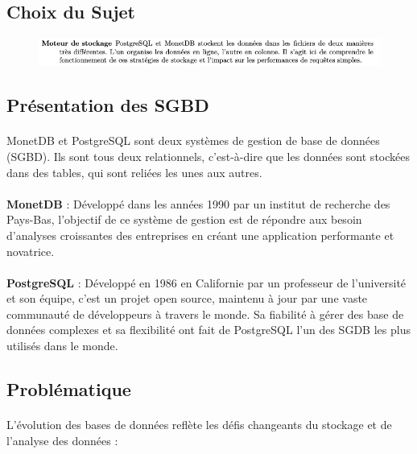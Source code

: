 \documentclass[11pt]{extarticle}
\begin{document}
\subsection{Choix du Sujet}

\begin{figure}[H]
    \centering
    \includegraphics[width=1\textwidth]{images/Sujet.png}
    \label{fig:sujet}
\end{figure}

\subsection{Présentation des SGBD}

\paragraph{} 
MonetDB et PostgreSQL sont deux systèmes de gestion de base de données (SGBD). Ils sont tous deux relationnels, c'est-à-dire que les données sont stockées dans des tables, qui sont reliées les unes aux autres.

\paragraph{} 
\textbf{MonetDB} : Développé dans les années 1990 par un institut de recherche des Pays-Bas, l'objectif de ce système de gestion est de répondre aux besoin d'analyses croissantes des entreprises en créant une application performante et novatrice.

\paragraph{} 
\textbf{PostgreSQL} : Développé en 1986 en Californie par un professeur de l'université et son équipe, c'est un projet open source, maintenu à jour par une vaste communauté de développeurs à travers le monde. Sa fiabilité à gérer des base de données complexes et sa flexibilité ont fait de PostgreSQL l'un des SGDB les plus utilisés dans le monde.

\subsection{Problématique}
\paragraph{}
L'évolution des bases de données reflète les défis changeants du stockage et de l'analyse des données :
\end{document}

